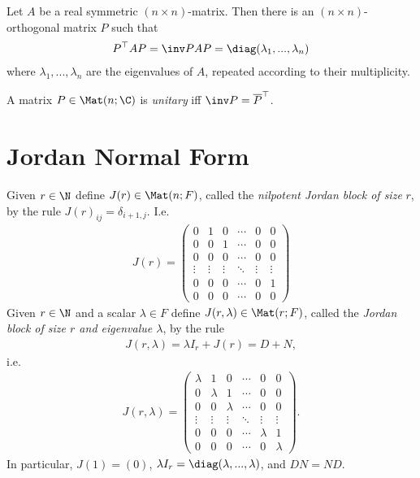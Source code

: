 \documentclass{article}
\begin{document}
\begin{corollary}
	Let $A$ be a real symmetric $(n\times n)$-matrix. Then there is an $(n\times n)$-orthogonal matrix $P$
	such that
	\begin{align*}
		P^\top AP = \inv PAP = \diag(\lambda_1,...,\lambda_n)
	\end{align*}
	where $\lambda_1,...,\lambda_n$ are the eigenvalues of $A$, repeated according to their multiplicity.
\end{corollary}

\begin{definition}
	A matrix $P\in\Mat(n;\C)$ is \emph{unitary} iff $\inv P=\overline{P}^\top$.
\end{definition}

\section{Jordan Normal Form}

\begin{definition}
	Given $r\in\N$ define $J(r)\in\Mat(n;F)$, called the \emph{nilpotent Jordan block of
		size} $r$, by the rule $J(r)_{ij}=\delta_{i+1,j}$. I.e.
	\begin{align*}
		J(r) = \begin{pmatrix}
			0      & 1      & 0      & \cdots & 0      & 0      \\
			0      & 0      & 1      & \cdots & 0      & 0      \\
			0      & 0      & 0      & \cdots & 0      & 0      \\
			\vdots & \vdots & \vdots & \ddots & \vdots & \vdots \\
			0      & 0      & 0      & \cdots & 0      & 1      \\
			0      & 0      & 0      & \cdots & 0      & 0
		\end{pmatrix}
	\end{align*}
	Given $r\in\N$ and a scalar $\lambda\in F$ define $J(r,\lambda)\in\Mat(r; F)$, called the
	\emph{Jordan block of size $r$ and eigenvalue $\lambda$}, by the rule
	\begin{align*}
		J(r,\lambda)=\lambda I_r + J(r) = D + N,
	\end{align*}
	i.e.
	\begin{align*}
		J(r,\lambda) = \begin{pmatrix}
			\lambda & 1       & 0       & \cdots & 0       & 0       \\
			0       & \lambda & 1       & \cdots & 0       & 0       \\
			0       & 0       & \lambda & \cdots & 0       & 0       \\
			\vdots  & \vdots  & \vdots  & \ddots & \vdots  & \vdots  \\
			0       & 0       & 0       & \cdots & \lambda & 1       \\
			0       & 0       & 0       & \cdots & 0       & \lambda
		\end{pmatrix}.
	\end{align*}
	In particular, $J(1)=(0)$, $\lambda I_r=\diag(\lambda, ..., \lambda)$, and $DN=ND$.
\end{definition}
\end{document}
